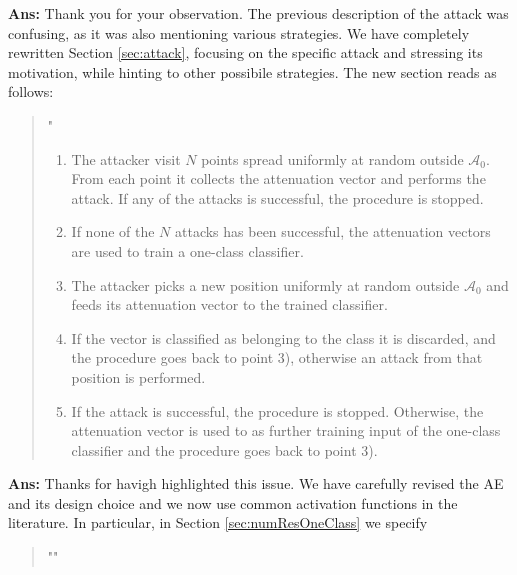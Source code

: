 \documentclass[draftcls,onecolumn,12pt]{IEEEtran}
\newcounter{revc}
\newcommand{\revp}[1]{\zref[revcontent]{#1}}
\begin{document}
{
\begin{framed}
\end{framed}
{\bf Ans:} Thank you for your observation. The previous description of the attack was confusing, as it was also mentioning various strategies. We have completely rewritten Section \ref{sec:attack}, focusing on the specific attack and stressing its motivation, while hinting to other possibile strategies. The new section reads as follows:
\begin{quote}
    "\revp{sezattack}
\begin{enumerate}
    \item The attacker visit  $N$  points spread uniformly at random outside $\mathcal A_0$. From each point it collects the attenuation vector and performs the attack. If any of the attacks is successful, the procedure is stopped.
    \item If none of the $N$ attacks has been successful, the attenuation vectors are used to train a one-class classifier.
    \item The attacker picks a new position uniformly at random outside $\mathcal A_0$ and feeds its attenuation vector to the trained classifier.
    \item If the vector is classified as belonging to the class it is discarded, and the procedure goes back to point 3), otherwise an attack from that position is performed.
    \item If the attack is successful, the procedure is stopped. Otherwise, the attenuation vector is used to as further training input of the one-class classifier and the procedure goes back to point 3).
\end{enumerate}
\revp{sezattack2} 
\end{quote}


\vspace{5mm} %
\begin{framed}
\end{framed}


{\bf Ans:} 
Thanks for havigh highlighted this issue. We have carefully revised the AE and its design choice and we now use common activation functions in the literature. In particular, in Section \ref{sec:numResOneClass} we specify
\begin{quote}
"\revp{designAE}"
\end{quote}

}
\end{document}
